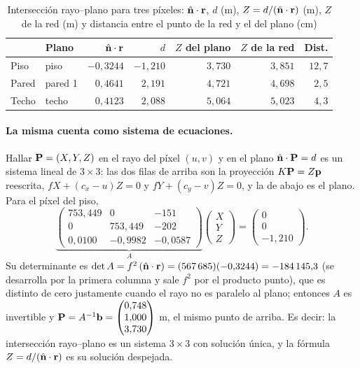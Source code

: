 \begin{table}[htbp]
\caption{Intersección rayo--plano para tres píxeles: $\hat{\mathbf{n}}\cdot\mathbf{r}$, $d$ (m), $Z=d/(\hat{\mathbf{n}}\cdot\mathbf{r})$ (m), $Z$ de la red (m) y distancia entre el punto de la red y el del plano (cm)}
\label{tab:hab-int}
\centering\small
\begin{tabular}{@{}llrrrrr@{}}
\toprule
 & Plano & $\hat{\mathbf{n}}\cdot\mathbf{r}$ & $d$ & $Z$ del plano & $Z$ de la red & Dist. \\
\midrule
Piso & piso & $-0{,}3244$ & $-1{,}210$ & $3{,}730$ & $3{,}851$ & $12{,}7$ \\
Pared & pared 1 & $0{,}4641$ & $2{,}191$ & $4{,}721$ & $4{,}698$ & $2{,}5$ \\
Techo & techo & $0{,}4123$ & $2{,}088$ & $5{,}064$ & $5{,}023$ & $4{,}3$ \\
\bottomrule
\end{tabular}
\end{table}

\paragraph{La misma cuenta como sistema de ecuaciones.} Hallar $\mathbf{P}=(X,Y,Z)$ en el rayo del píxel $(u,v)$ y en el plano $\hat{\mathbf{n}}\cdot\mathbf{P}=d$ es
un sistema lineal de $3\times3$: las dos filas de arriba son la proyección $K\mathbf{P}=Z\mathbf{p}$ reescrita, $fX+(c_x-u)Z=0$ y $fY+(c_y-v)Z=0$, y la de abajo es el plano.
Para el píxel del piso,
\begin{equation}
\underbrace{\begin{pmatrix}753{,}449&0&-151\\0&753{,}449&-202\\0{,}0100&-0{,}9982&-0{,}0587\end{pmatrix}}_{A}
\begin{pmatrix}X\\Y\\Z\end{pmatrix}=\begin{pmatrix}0\\0\\-1{,}210\end{pmatrix}.
\end{equation}
Su determinante es $\det A=f^{2}\,(\hat{\mathbf{n}}\cdot\mathbf{r})=(567\,685)(-0{,}3244)=-184\,145{,}3$ (se desarrolla por la primera columna y sale $f^2$ por el producto punto), que es distinto de
cero justamente cuando el rayo no es paralelo al plano; entonces $A$ es invertible y $\mathbf{P}=A^{-1}\mathbf{b}=\begin{pmatrix} 0{,}748 \\ 1{,}000 \\ 3{,}730 \end{pmatrix}$ m, el mismo punto de arriba. Es decir: la intersección
rayo--plano es un sistema $3\times3$ con solución única, y la fórmula $Z=d/(\hat{\mathbf{n}}\cdot\mathbf{r})$ es su solución despejada.

